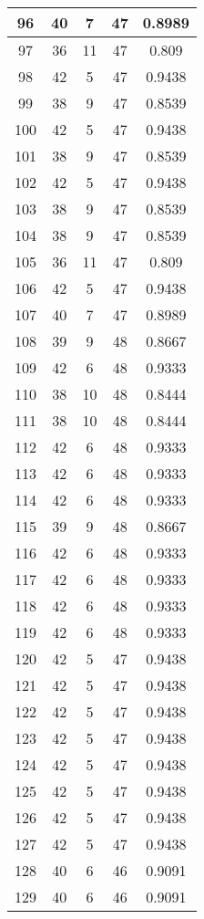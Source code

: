 \documentclass[letterpaper, 12pt]{article}
\begin{document}
\begin{longtable}{|c|c|c|c|c|}
\hline
96 & 40 & 7 & 47 & 0.8989 \\
\hline
97 & 36 & 11 & 47 & 0.809 \\
\hline
98 & 42 & 5 & 47 & 0.9438 \\
\hline
99 & 38 & 9 & 47 & 0.8539 \\
\hline
100 & 42 & 5 & 47 & 0.9438 \\
\hline
101 & 38 & 9 & 47 & 0.8539 \\
\hline
102 & 42 & 5 & 47 & 0.9438 \\
\hline
103 & 38 & 9 & 47 & 0.8539 \\
\hline
104 & 38 & 9 & 47 & 0.8539 \\
\hline
105 & 36 & 11 & 47 & 0.809 \\
\hline
106 & 42 & 5 & 47 & 0.9438 \\
\hline
107 & 40 & 7 & 47 & 0.8989 \\
\hline
108 & 39 & 9 & 48 & 0.8667 \\
\hline
109 & 42 & 6 & 48 & 0.9333 \\
\hline
110 & 38 & 10 & 48 & 0.8444 \\
\hline
111 & 38 & 10 & 48 & 0.8444 \\
\hline
112 & 42 & 6 & 48 & 0.9333 \\
\hline
113 & 42 & 6 & 48 & 0.9333 \\
\hline
114 & 42 & 6 & 48 & 0.9333 \\
\hline
115 & 39 & 9 & 48 & 0.8667 \\
\hline
116 & 42 & 6 & 48 & 0.9333 \\
\hline
117 & 42 & 6 & 48 & 0.9333 \\
\hline
118 & 42 & 6 & 48 & 0.9333 \\
\hline
119 & 42 & 6 & 48 & 0.9333 \\
\hline
120 & 42 & 5 & 47 & 0.9438 \\
\hline
121 & 42 & 5 & 47 & 0.9438 \\
\hline
122 & 42 & 5 & 47 & 0.9438 \\
\hline
123 & 42 & 5 & 47 & 0.9438 \\
\hline
124 & 42 & 5 & 47 & 0.9438 \\
\hline
125 & 42 & 5 & 47 & 0.9438 \\
\hline
126 & 42 & 5 & 47 & 0.9438 \\
\hline
127 & 42 & 5 & 47 & 0.9438 \\
\hline
128 & 40 & 6 & 46 & 0.9091 \\
\hline
129 & 40 & 6 & 46 & 0.9091 \\

\end{longtable}
\end{document}
